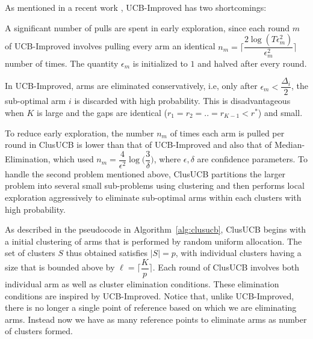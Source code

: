
As mentioned in a recent work \cite{liu2016modification}, UCB-Improved has two shortcomings: 	\\
\begin{inparaenum}[\bfseries(i)]
\item A significant number of pulls are spent in early exploration, since each round $m$ of UCB-Improved involves pulling every arm an identical $n_{m}=\bigg\lceil \dfrac{ 2\log(T\epsilon^{2}_{m})}{\epsilon^{2}_{m}} \bigg\rceil$ number of times. The quantity $\epsilon_{m}$ is initialized to $1$ and halved after every round.\\
\item In UCB-Improved, arms are eliminated conservatively, i.e, only after $\epsilon_{m}<\dfrac{\Delta_{i}}{2}$, the sub-optimal arm $i$ is discarded with high probability. This is disadvantageous when $K$ is large and the gaps are identical ($r_{1}=r_{2}=..=r_{K-1}<r^{*}$) and small.\\
\end{inparaenum}
To reduce early exploration, the number $n_m$ of times each arm is pulled per round in ClusUCB is lower than that of UCB-Improved and also that of Median-Elimination, which used $n_m=\dfrac{4}{\epsilon^{2}}\log\big(\dfrac{3}{\delta}\big)$, where $\epsilon,\delta$ are confidence parameters.
To handle the second problem mentioned above, ClusUCB partitions the larger problem into several small sub-problems using clustering and then performs local exploration aggressively to eliminate sub-optimal arms within each clusters with high probability.


As described in the pseudocode in Algorithm~\ref{alg:clusucb}, ClusUCB begins with a initial clustering of arms that is performed by random uniform allocation. The set of clusters $S$ thus obtained satisfies $|S|=p$, with individual clusters having a size that is bounded above by $\ell=\bigg\lceil \dfrac{K}{p} \bigg\rceil$.
Each round of ClusUCB involves both individual arm as well as cluster elimination conditions. These elimination conditions are inspired by UCB-Improved. Notice that, unlike UCB-Improved, there is no longer a single point of reference based on which we are eliminating arms. Instead now we have as many reference points to eliminate arms as number of clusters formed. 

